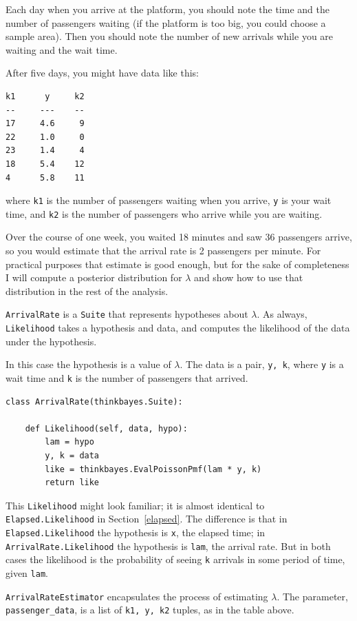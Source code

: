 \documentclass[12pt]{book}
\begin{document}
Each day when you arrive at the platform, you should note the
time and the number of passengers waiting (if the platform is too
big, you could choose a sample area).  Then you should note the
number of new arrivals while you are waiting and the wait time.

After five days, you might have data like this:
%
\begin{verbatim}
k1      y     k2
--     ---    --
17     4.6     9
22     1.0     0
23     1.4     4
18     5.4    12
4      5.8    11
\end{verbatim}
%
where {\tt k1} is the number of passengers waiting when you arrive,
{\tt y} is your wait time, and {\tt k2} is the number of passengers
who arrive while you are waiting.

Over the course of one week, you waited 18 minutes and saw 36
passengers arrive, so you would estimate that the arrival rate is
2 passengers per minute.  For practical purposes that estimate is
good enough, but for the sake of completeness I
will compute a posterior distribution for $\lambda$ and show how
to use that distribution in the rest of the analysis.

{\tt ArrivalRate} is a {\tt Suite} that represents hypotheses about
$\lambda$.  As always, {\tt Likelihood} takes a hypothesis and data,
and computes the likelihood of the data under the hypothesis.

In this case the hypothesis is a value of $\lambda$.  The data is a
pair, {\tt y, k}, where {\tt y} is a wait time and {\tt k} is the
number of passengers that arrived.

\begin{verbatim}
class ArrivalRate(thinkbayes.Suite):

    def Likelihood(self, data, hypo):
        lam = hypo
        y, k = data
        like = thinkbayes.EvalPoissonPmf(lam * y, k)
        return like
\end{verbatim}

This {\tt Likelihood} might look familiar; it
is almost identical to {\tt Elapsed.Likelihood} in
Section~\ref{elapsed}.  The difference is that in {\tt
  Elapsed.Likelihood} the hypothesis is {\tt x}, the elapsed time; in
{\tt ArrivalRate.Likelihood} the hypothesis is {\tt lam}, the arrival
rate.  But in both cases the likelihood is the probability of seeing
{\tt k} arrivals in some period of time, given {\tt lam}.

{\tt ArrivalRateEstimator} encapsulates the process of estimating
$\lambda$.  The parameter, \verb"passenger_data", is a list
of {\tt k1, y, k2} tuples, as in the table above.
\end{document}
